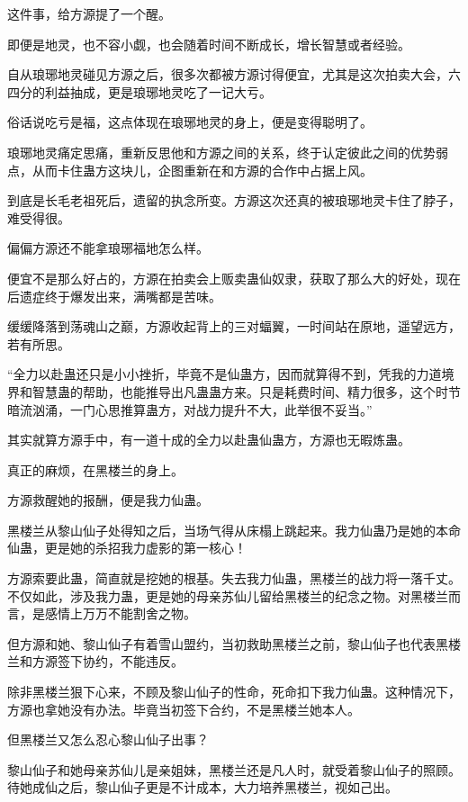 
\begin{this_body}

这件事，给方源提了一个醒。

即便是地灵，也不容小觑，也会随着时间不断成长，增长智慧或者经验。

自从琅琊地灵碰见方源之后，很多次都被方源讨得便宜，尤其是这次拍卖大会，六四分的利益抽成，更是琅琊地灵吃了一记大亏。

俗话说吃亏是福，这点体现在琅琊地灵的身上，便是变得聪明了。

琅琊地灵痛定思痛，重新反思他和方源之间的关系，终于认定彼此之间的优势弱点，从而卡住蛊方这块儿，企图重新在和方源的合作中占据上风。

到底是长毛老祖死后，遗留的执念所变。方源这次还真的被琅琊地灵卡住了脖子，难受得很。

偏偏方源还不能拿琅琊福地怎么样。

便宜不是那么好占的，方源在拍卖会上贩卖蛊仙奴隶，获取了那么大的好处，现在后遗症终于爆发出来，满嘴都是苦味。

缓缓降落到荡魂山之巅，方源收起背上的三对蝠翼，一时间站在原地，遥望远方，若有所思。

“全力以赴蛊还只是小小挫折，毕竟不是仙蛊方，因而就算得不到，凭我的力道境界和智慧蛊的帮助，也能推导出凡蛊蛊方来。只是耗费时间、精力很多，这个时节暗流汹涌，一门心思推算蛊方，对战力提升不大，此举很不妥当。”

其实就算方源手中，有一道十成的全力以赴蛊仙蛊方，方源也无暇炼蛊。

真正的麻烦，在黑楼兰的身上。

方源救醒她的报酬，便是我力仙蛊。

黑楼兰从黎山仙子处得知之后，当场气得从床榻上跳起来。我力仙蛊乃是她的本命仙蛊，更是她的杀招我力虚影的第一核心！

方源索要此蛊，简直就是挖她的根基。失去我力仙蛊，黑楼兰的战力将一落千丈。不仅如此，涉及我力蛊，更是她的母亲苏仙儿留给黑楼兰的纪念之物。对黑楼兰而言，是感情上万万不能割舍之物。

但方源和她、黎山仙子有着雪山盟约，当初救助黑楼兰之前，黎山仙子也代表黑楼兰和方源签下协约，不能违反。

除非黑楼兰狠下心来，不顾及黎山仙子的性命，死命扣下我力仙蛊。这种情况下，方源也拿她没有办法。毕竟当初签下合约，不是黑楼兰她本人。

但黑楼兰又怎么忍心黎山仙子出事？

黎山仙子和她母亲苏仙儿是亲姐妹，黑楼兰还是凡人时，就受着黎山仙子的照顾。待她成仙之后，黎山仙子更是不计成本，大力培养黑楼兰，视如己出。


\end{this_body}

